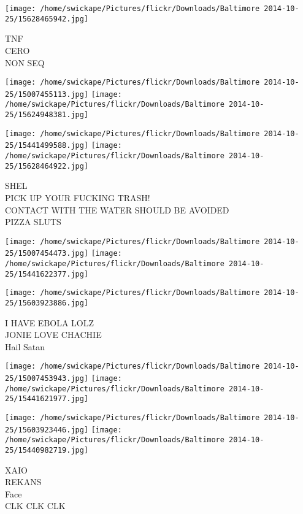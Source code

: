 \documentclass[10pt,letterpaper]{article}
\begin{document}
\vspace{0.25in}
\texttt{[image: /home/swickape/Pictures/flickr/Downloads/Baltimore 2014-10-25/15628465942.jpg]}

TNF\\
CERO\\
NON SEQ\\
\pagebreak

\texttt{[image: /home/swickape/Pictures/flickr/Downloads/Baltimore 2014-10-25/15007455113.jpg]}
\texttt{[image: /home/swickape/Pictures/flickr/Downloads/Baltimore 2014-10-25/15624948381.jpg]}

\texttt{[image: /home/swickape/Pictures/flickr/Downloads/Baltimore 2014-10-25/15441499588.jpg]}
\texttt{[image: /home/swickape/Pictures/flickr/Downloads/Baltimore 2014-10-25/15628464922.jpg]}

SHEL\\
PICK UP YOUR FUCKING TRASH!\\
CONTACT WITH THE WATER SHOULD BE AVOIDED\\
PIZZA SLUTS\\
\pagebreak

\texttt{[image: /home/swickape/Pictures/flickr/Downloads/Baltimore 2014-10-25/15007454473.jpg]}
\texttt{[image: /home/swickape/Pictures/flickr/Downloads/Baltimore 2014-10-25/15441622377.jpg]}

\vspace{0.25in}
\texttt{[image: /home/swickape/Pictures/flickr/Downloads/Baltimore 2014-10-25/15603923886.jpg]}

I HAVE EBOLA LOLZ\\
JONIE LOVE CHACHIE\\
Hail Satan\\
\pagebreak

\texttt{[image: /home/swickape/Pictures/flickr/Downloads/Baltimore 2014-10-25/15007453943.jpg]}
\texttt{[image: /home/swickape/Pictures/flickr/Downloads/Baltimore 2014-10-25/15441621977.jpg]}

\texttt{[image: /home/swickape/Pictures/flickr/Downloads/Baltimore 2014-10-25/15603923446.jpg]}
\texttt{[image: /home/swickape/Pictures/flickr/Downloads/Baltimore 2014-10-25/15440982719.jpg]}

XAIO\\
REKANS\\
Face\\
CLK CLK CLK\\
\pagebreak
\end{document}
